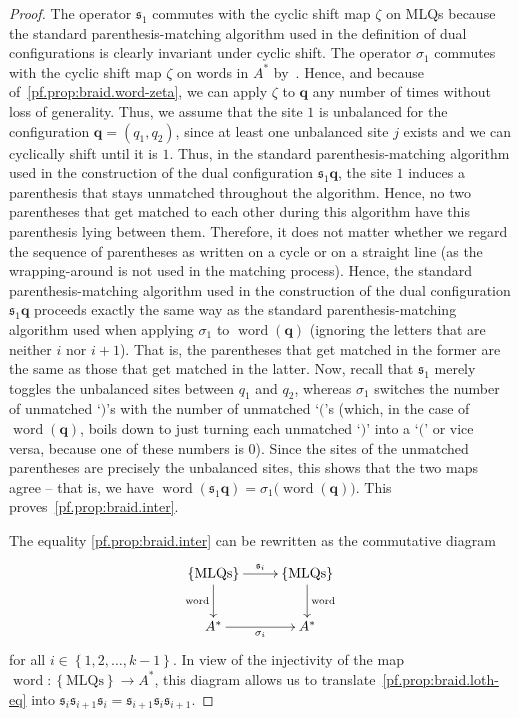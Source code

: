\documentclass[reqno]{amsart}
\newcommand{\0}{\phantom{c}}
\DeclareMathOperator{\inter}{int} %
\newcommand{\qq}{\mathbf{q}}
\newcommand{\fraks}{\mathfrak{s}}
\newcommand{\word}{\operatorname{word}}
\newcommand{\set}[1]{\left\{ #1 \right\}}
\theoremstyle{plain}
\theoremstyle{definition}
\numberwithin{equation}{section}
\begin{document}
\begin{proof}
The operator $\fraks_1$ commutes with the cyclic shift map $\zeta$ on MLQs because the standard parenthesis-matching algorithm used in the definition of dual configurations is clearly invariant under cyclic shift.
The operator $\sigma_1$ commutes with the cyclic shift map $\zeta$ on words in $A^*$ by~\cite[Prop.~5.6.1]{Loth}.
Hence, and because of~\eqref{pf.prop:braid.word-zeta}, we can apply $\zeta$ to $\qq$ any number of times without loss of generality.
Thus, we assume that the site $1$ is unbalanced for the configuration $\qq = (q_1, q_2)$, since at least one unbalanced site $j$ exists and we can cyclically shift until it is $1$.
Thus, in the standard parenthesis-matching algorithm used in the construction of the dual configuration $\fraks_1 \qq$, the site $1$ induces a parenthesis that stays unmatched throughout the algorithm.
Hence, no two parentheses that get matched to each other during this algorithm have this parenthesis lying between them.
Therefore, it does not matter whether we regard the sequence of parentheses as written on a cycle or on a straight line (as the wrapping-around is not used in the matching process).
Hence, the standard parenthesis-matching algorithm used in the construction of the dual configuration $\fraks_1 \qq$ proceeds exactly the same way as the standard parenthesis-matching algorithm used when applying $\sigma_1$ to $\word(\qq)$ (ignoring the letters that are neither $i$ nor $i+1$). That is, the parentheses that get matched in the former are the same as those that get matched in the latter.
Now, recall that $\fraks_1$ merely toggles the unbalanced sites between $q_1$ and $q_2$, whereas $\sigma_1$ switches the number of unmatched `$)$'s with the number of unmatched `$($'s (which, in the case of $\word(\qq)$, boils down to just turning each unmatched `$)$' into a `$($' or vice versa, because one of these numbers is $0$).
Since the sites of the unmatched parentheses are precisely the unbalanced sites, this shows that the two maps agree -- that is, we have $\word(\fraks_1 \qq) = \sigma_1\bigl( \word(\qq) \bigr)$.
This proves~\eqref{pf.prop:braid.inter}.

The equality \eqref{pf.prop:braid.inter} can be rewritten as the
commutative diagram
\[
\xymatrix{
 \set{\text{MLQs}} \ar[r]^{\fraks_i} \ar[d]_{\word} & \set{\text{MLQs}} \ar[d]^{\word} \\
 A^* \ar[r]_{\sigma_i} & A^*
}
\]
for all $i \in \set{1, 2, \dotsc, k-1}$.
In view of the injectivity of the map $\word \colon \set{\text{MLQs}} \to A^*$,
this diagram allows us to translate~\eqref{pf.prop:braid.loth-eq} into
$\fraks_i \fraks_{i+1} \fraks_i = \fraks_{i+1} \fraks_i \fraks_{i+1}$.
\end{proof}
\end{document}
